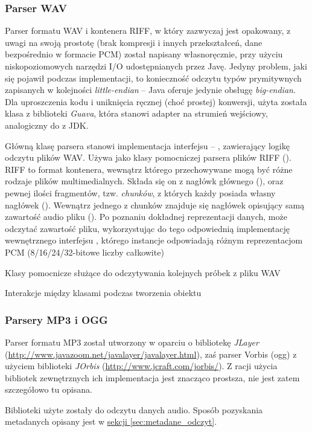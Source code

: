 \subsubsection{Parser WAV}

Parser formatu WAV i kontenera RIFF, w który zazwyczaj jest opakowany, z uwagi na swoją prostotę
(brak kompresji i innych przekształceń, dane bezpośrednio w formacie PCM) został napisany
własnoręcznie, przy użyciu niskopoziomowych narzędzi I/O udostępnianych przez Javę. Jedyny problem,
jaki się pojawił podczas implementacji, to konieczność odczytu typów prymitywnych zapisanych w
kolejności \textit{little-endian} -- Java oferuje jedynie obsługę \textit{big-endian}. Dla
uproszczenia kodu i uniknięcia ręcznej (choć prostej) konwersji, użyta została klasa
 z biblioteki \emph{Guava}, która stanowi adapter na strumień
wejściowy, analogiczny do  z JDK.


Główną klasę parsera stanowi implementacja interfejsu  -- ,
zawierający logikę odczytu plików WAV. Używa jako klasy pomocniczej parsera plików RIFF
(). RIFF to format kontenera, wewnątrz którego przechowywane mogą być różne rodzaje
plików multimedialnych. Składa się on z nagłówk głównego (), oraz pewnej ilości
fragmentów, tzw. \textit{chunków}, z których każdy posiada własny nagłówek ().
Wewnątrz jednego z chunków znajduje się nagłówek opisujący samą zawartość audio pliku
(). Po poznaniu dokładnej reprezentacji danych,  może odczytać
zawartość pliku, wykorzystując do tego odpowiednią implementację wewnętrznego interfejsu
, którego instancje odpowiadają różnym reprezentacjom PCM (8/16/24/32-bitowe liczby
całkowite)

{Klasy pomocnicze służące do odczytywania kolejnych próbek z pliku WAV}

{Interakcje między klasami podczas tworzenia obiektu }


\subsubsection{Parsery MP3 i OGG}

Parser formatu MP3 został utworzony w oparciu o bibliotekę
\emph{JLayer} (\url{http://www.javazoom.net/javalayer/javalayer.html}), zaś parser Vorbis (ogg) z
użyciem biblioteki \emph{JOrbis} (\url{http://www.jcraft.com/jorbis/}). Z racji użycia bibliotek
zewnętrznych ich implementacja jest znacząco prostsza, nie jest zatem szczegółowo tu opisana.

Biblioteki użyte zostały do odczytu danych audio. Sposób pozyskania metadanych opisany jest w
\hyperref[sec:metadane_odczyt]{sekcji \ref*{sec:metadane_odczyt}}.



